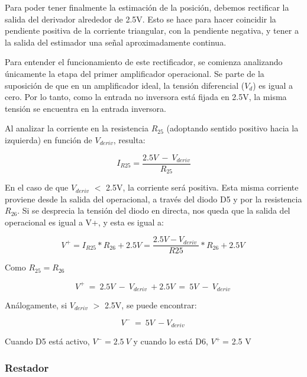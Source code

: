 \noindent Para poder tener finalmente la estimaci\'{o}n de la posici\'{o}n, debemos rectificar la salida del derivador alrededor de 2.5V. Esto se hace para hacer coincidir la pendiente positiva de la corriente triangular, con la pendiente negativa, y tener a la salida del estimador una se\~{n}al aproximadamente continua.

\noindent Para entender el funcionamiento de este rectificador, se comienza analizando \'{u}nicamente la etapa del primer amplificador operacional. Se parte de la suposici\'{o}n de que en un amplificador ideal, la tensi\'{o}n diferencial ($V_d$) es igual a cero. Por lo tanto, como la entrada no inversora est\'{a} fijada en 2.5V, la misma tensi\'{o}n se encuentra en la entrada inversora.

\noindent Al analizar la corriente en la resistencia $R_{25}$ (adoptando sentido positivo hacia la izquierda) en funci\'{o}n de $V_{deriv}$, resulta:

\begin{equation} \label{eq_corriente_r25}
	I_{R25}=\frac{2.5V\ -\ V_{deriv}}{R_{25}}
\end{equation}

\noindent En el caso de que $V_{deriv}$ $\mathrm{<}$ 2.5V, la corriente ser\'{a} positiva. Esta misma corriente proviene desde la salida del operacional, a trav\'{e}s del diodo D5 y por la resistencia $R_{26}$. Si se desprecia la tensi\'{o}n del diodo en directa, nos queda que la salida del operacional es igual a V+, y esta es igual a:

\begin{equation} \label{eq_V+}
	V^+=I_{R25}*R_{26}+2.5V=\frac{2.5V-V_{deriv}\ }{R25}*R_{26}+2.5V\ 
\end{equation} 

Como $R_{25}=R_{26}$

\begin{equation} \label{eq_V+_2}
	V^+\ =\ 2.5V\ -\ V_{deriv}\ +2.5V\ =\ 5V\ -\ V_{deriv}\ 
\end{equation}

An\'{a}logamente, si $V_{deriv}$ $\mathrm{>}$ 2.5V, se puede encontrar:

\begin{equation} \label{eq_V+_3}
	V^-\ =\ {5V\ -V}_{deriv}\ 
\end{equation}

Cuando D5 est\'{a} activo, $V^-=2.5\ V$ y cuando lo est\'{a} D6, $V^+\ $= 2.5 V

\subsubsection{Restador}

